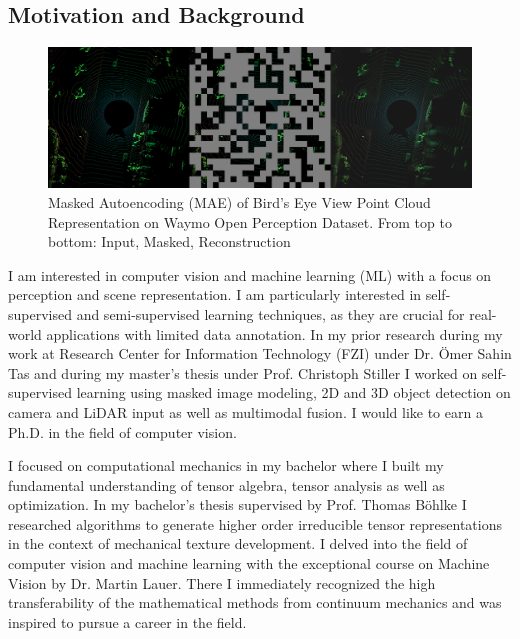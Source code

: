 


\setlength{\columnsep}{15pt}%
\setlength{\intextsep}{0pt plus 0pt minus 0pt}


\setlength{\parindent}{\myindent}

 \vspace*{-10pt}

\subsection{\textbf{Motivation and Background}}
\begin{figure}
    \includegraphics[width=330pt, angle=270]{pic/Hiera-Waymo.png}
    \mainfont\fontsize{9pt}{9pt}\selectfont\caption{ \mainfont\fontsize{9pt}{9pt}\selectfont Masked Autoencoding 
    (MAE) of Bird's Eye View Point Cloud Representation on Waymo Open Perception Dataset. From top to bottom: Input, Masked, Reconstruction}
    \label{fig:mae_img}
    \end{figure}
    I am interested in computer vision and machine learning (ML) with a focus on perception and scene representation. I am particularly interested in self-supervised and semi-supervised learning techniques, as they are crucial for real-world applications with limited data annotation. In my prior research during my work at Research Center for Information Technology (FZI) under Dr. Ömer Sahin Tas and during my master’s thesis under Prof. Christoph Stiller I worked on self-supervised learning using masked image modeling, 2D and 3D object detection on camera and LiDAR input as well as multimodal fusion. I would like to earn a Ph.D. in the field of computer vision.

    I focused on computational mechanics in my bachelor where I built my fundamental understanding of tensor algebra, tensor analysis as well as optimization. In my bachelor’s thesis supervised by Prof. Thomas Böhlke I researched algorithms to generate higher order irreducible tensor representations in the context of mechanical texture development. I delved into the field of computer vision and machine learning with the exceptional course on Machine Vision by Dr. Martin Lauer. There I immediately recognized the high transferability of the mathematical methods from continuum mechanics and was inspired to pursue a career in the field.

